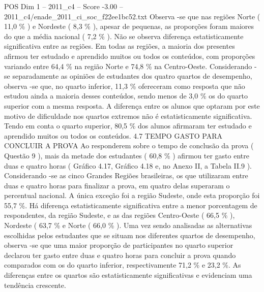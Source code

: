 \begin{textsample}{POS Dim 1 – 2011\_c4 – Score -3.00 – 2011\_c4/enade\_2011\_ci\_soc\_f22ee1bc52.txt}
Observa -se que nas regiões Norte ( 11,0 \% ) e Nordeste ( 8,3 \% ), apesar de pequenas, as proporções foram maiores do que a média nacional ( 7,2 \% ).
Não se observa diferença estatisticamente significativa entre as regiões.
Em todas as regiões, a maioria dos presentes afirmou ter estudado e aprendido muitos ou todos os conteúdos, com proporções variando entre 64,4 \% na região Norte e 74,8 \% na Centro-Oeste.
Considerando -se separadamente as opiniões de estudantes dos quatro quartos de desempenho, observa -se que, no quarto inferior, 11,3 \% ofereceram como resposta que não estudou ainda a maioria desses conteúdos, sendo menos de 3,0 \% os do quarto superior com a mesma resposta.
A diferença entre os alunos que optaram por este motivo de dificuldade nos quartos extremos não é estatisticamente significativa.
Tendo em conta o quarto superior, 80,5 \% dos alunos afirmaram ter estudado e aprendido muitos ou todos os conteúdos. 4.7 TEMPO GASTO PARA CONCLUIR A PROVA Ao responderem sobre o tempo de conclusão da prova ( Questão 9 ), mais da metade dos estudantes ( 60,8 \% ) afirmou ter gasto entre duas e quatro horas ( Gráfico 4.17, Gráfico 4.18 e, no Anexo II, a Tabela II.9 ).
Considerando -se as cinco Grandes Regiões brasileiras, os que utilizaram entre duas e quatro horas para finalizar a prova, em quatro delas superaram o percentual nacional.
A única exceção foi a região Sudeste, onde esta proporção foi 55,7 \%.
Há diferença estatisticamente significativa entre a menor porcentagem de respondentes, da região Sudeste, e as das regiões Centro-Oeste ( 66,5 \% ), Nordeste ( 63,7 \% e Norte ( 66,0 \% ).
Uma vez sendo analisadas as alternativas escolhidas pelos estudantes que se situam nos diferentes quartos de desempenho, observa -se que uma maior proporção de participantes no quarto superior declarou ter gasto entre duas e quatro horas para concluir a prova quando comparados com os do quarto inferior, respectivamente 71,2 \% e 23,2 \%.
As diferenças entre os quartos são estatisticamente significativas e evidenciam uma tendência crescente.

\end{textsample}
